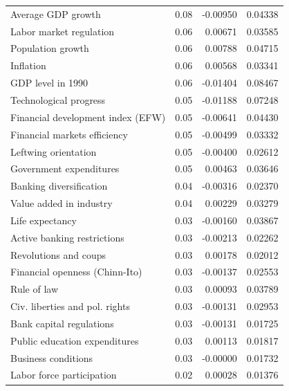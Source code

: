 \begin{refsection}
\begin{subappendices}
\begin{table}[!ht]
\begin{tabular}{lrrr}
      Average GDP growth & 0.08 & -0.00950 & 0.04338 \\ 
      Labor market regulation & 0.06 & 0.00671 & 0.03585 \\ 
      Population growth & 0.06 & 0.00788 & 0.04715 \\ 
      Inflation & 0.06 & 0.00568 & 0.03341 \\ 
      GDP level in 1990 & 0.06 & -0.01404 & 0.08467 \\ 
      Technological progress & 0.05 & -0.01188 & 0.07248 \\ 
      Financial development index (EFW) & 0.05 & -0.00641 & 0.04430 \\ 
      Financial markets efficiency & 0.05 & -0.00499 & 0.03332 \\ 
      Leftwing orientation & 0.05 & -0.00400 & 0.02612 \\ 
      Government expenditures & 0.05 & 0.00463 & 0.03646 \\ 
      Banking diversification & 0.04 & -0.00316 & 0.02370 \\ 
      Value added in industry & 0.04 & 0.00229 & 0.03279 \\ 
      Life expectancy & 0.03 & -0.00160 & 0.03867 \\ 
      Active banking restrictions & 0.03 & -0.00213 & 0.02262 \\ 
      Revolutions and coups & 0.03 & 0.00178 & 0.02012 \\ 
      Financial openness (Chinn-Ito) & 0.03 & -0.00137 & 0.02553 \\ 
      Rule of law & 0.03 & 0.00093 & 0.03789 \\ 
      Civ. liberties and pol. rights & 0.03 & -0.00131 & 0.02953 \\ 
      Bank capital regulations & 0.03 & -0.00131 & 0.01725 \\ 
      Public education expenditures & 0.03 & 0.00113 & 0.01817 \\ 
      Business conditions & 0.03 & -0.00000 & 0.01732 \\ 
      Labor force participation & 0.02 & 0.00028 & 0.01376 \\  
      \bottomrule
    \end{tabular}
    \end{table}
    
    \clearpage
    

\end{subappendices}
\end{refsection}
